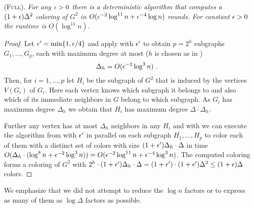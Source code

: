 \textsc{ (Full)}. 
\emph{For any  $\epsilon>0$ there is a deterministic {\congest} algorithm that computes a $(1+\epsilon)\Delta^2$ coloring of $G^2$ in $O(\epsilon^{-2}\log^{11} n+\epsilon^{-4}\log n)$ rounds. For constant $\epsilon>0$ the runtime is $O(\log^{11}n)$.}

\begin{proof}
Let $\epsilon'=\min\{1,\epsilon/4\}$ and apply  with $\epsilon'$ to obtain  $p=2^h$ subgraphs $G_1,\ldots,G_p$, each with maximum degree at most ($h$ is chosen as in )
\begin{align}
\Delta_h=O(\epsilon^{-2}\log^3 n)~.
\end{align}
Then, for $i=1,\ldots,p$ let $H_i$ be the subgraph of $G^2$ that is induced by the vertices $V(G_i)$ of $G_i$. Here each vertex knows which subgraph it belongs to and also which of its immediate neighbors in $G$ belong to which subgraph.
 As $G_i$ has maximum degree $\Delta_h$ we obtain that $H_i$ has maximum degree $\Delta\cdot \Delta_h$. 

Further any vertex has at most $\Delta_h$ neighbors in any $H_i$ and 
with  we can execute the algorithm from  with $\epsilon'$ in parallel on each subgraph $H_1, \ldots, H_p$ to color each of them with a distinct set of colors with size $(1+\epsilon')\Delta_h\cdot \Delta$ in time $O(\Delta_h\cdot (\log^8 n+\epsilon^{-2}\log^3 n))=O(\epsilon^{-2}\log^{11} n+\epsilon^{-4}\log^3 n)$.
The computed coloring forms a coloring of $G^2$ with $2^h\cdot (1+\epsilon')\Delta_h\cdot \Delta=(1+\epsilon')\cdot (1+\epsilon')\Delta^2\leq(1+\epsilon)\Delta$ colors. 
\end{proof}

\begin{remark}
We emphasize that we did not attempt to reduce the $\log n$ factors or to express as many of them as $\log \Delta$ factors as possible. 
\end{remark}


